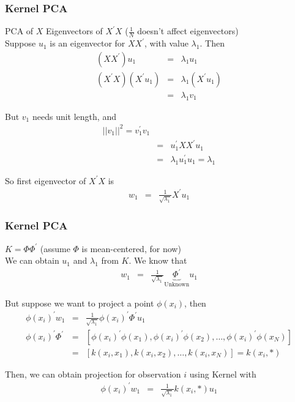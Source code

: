 \begin{frame}[fragile]
\frametitle{Kernel PCA}

PCA of ${X}$ Eigenvectors of ${X}^{'}{X}$ ($\frac{1}{N}$ doesn't affect eigenvectors)  \\
Suppose ${u}_{1}$ is an eigenvector for ${X}{X}^{'}$, with value $\lambda_{1}$.   Then   
\begin{eqnarray}
({X}{X}^{'}){u}_{1} & = & \lambda_{1} {u}_{1} \nonumber \\ 
({X}^{'}{X}) ({X}^{'} {u}_{1})  & = & \lambda_{1} ({X}^{'}{u}_{1}) \nonumber \\ 
 & = & \lambda_{1} {v}_{1} \nonumber
\end{eqnarray}

But ${v}_{1}$ needs unit length, and  
\begin{eqnarray}
||{v}_{1}||^{2}  = {v}^{'}_{1} {v}_{1}  \nonumber \\
& = & {u}_{1}^{'}{X}{X}^{'}{u}_{1} \nonumber \\ 
& = & \lambda_{1} {u}_{1}^{'}{u}_{1} = \lambda_{1}  \nonumber 
\end{eqnarray}

So first eigenvector of ${X}^{'}{X}$ is 
\begin{eqnarray}
{w}_{1} & = & \frac{1}{\sqrt{\lambda_{1}} } {X}^{'}{u}_{1} \nonumber
\end{eqnarray}

\end{frame}

\begin{frame}[fragile]
\frametitle{Kernel PCA}

${K} = {\Phi}{\Phi}^{'}$ (assume ${\Phi}$ is mean-centered, for now)  \\

We can obtain ${u}_{1}$ and $\lambda_{1}$ from ${K}$.  We know that 
\begin{eqnarray}
{w}_{1} & = & \frac{1}{\sqrt{\lambda_{1}}} \underbrace{{\Phi}^{'}}_{\text{Unknown}} {u}_{1} \nonumber 
\end{eqnarray}

But suppose we want to project a point $\phi({x}_{i})$, then  
\begin{eqnarray} 
\phi({x}_{i})^{'}{w}_{1}  &= & \frac{1}{\sqrt{\lambda_{1}}} \phi({x}_{i})^{'} {\Phi}^{'} {u}_{1} \nonumber \\
\phi({x}_{i})^{'} {\Phi}^{'} & = & \left[\phi({x}_{i} )^{'}\phi({x}_{1}), \phi({x}_{i} )^{'}\phi({x}_{2}), \hdots, \phi({x}_{i} )^{'}\phi({x}_{N}) \right] \nonumber \\
 &  = & \left[k({x}_{i}, {x}_{1}) , k({x}_{i}, {x}_{2}) , \hdots, k({x}_{i}, {x}_{N}) \right] = {k}({x}_{i}, * ) \nonumber 
\end{eqnarray}

Then, we can obtain projection for observation $i$ using Kernel with
\begin{eqnarray}
\phi({x}_{i})^{'} {w}_{1} & = & \frac{1}{\sqrt{\lambda_{1}}} {k}({x}_{i}, *) {u}_{1} \nonumber 
\end{eqnarray}


\end{frame}

